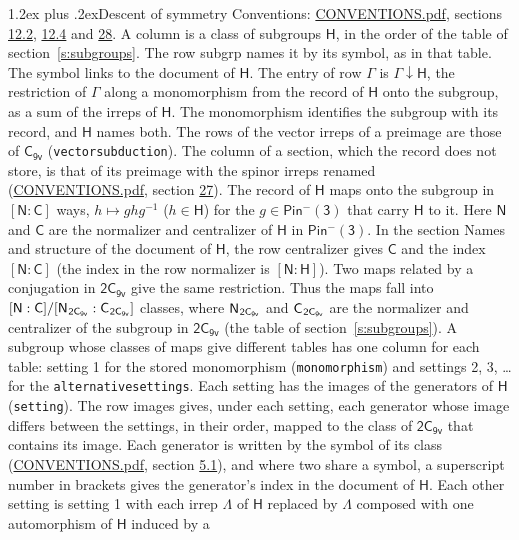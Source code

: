 \documentclass[10pt,a4paper]{article}
\makeatletter
\renewcommand\section{\@startsection{section}{1}{\z@}{-3ex plus -1ex minus -.2ex}%
  {1.2ex plus .2ex}{\normalfont\large\sffamily\bfseries\color{parttitle}}}
\numberwithin{equation}{section}
\newcommand{\grp}[1]{\mathsf{#1}}
\newcommand{\grpindex}[2]{[#1 : #2]}
\newcommand{\restr}[2]{#1\!\downarrow#2}
\newcommand{\hairsp}{\mkern1mu}
\makeatother
\begin{document}
\section{Descent of symmetry}\label{s:subduction}
Conventions: \href{../../CONVENTIONS.pdf}{CONVENTIONS.pdf}, sections \href{../../../rotation/CONVENTIONS.pdf\#conv.12.2}{12.2}, \href{../../../rotation/CONVENTIONS.pdf\#conv.12.4}{12.4} and \href{../../CONVENTIONS.pdf\#conv.28}{28}.
A column is a class of subgroups $\grp{H}$, in the order of the table of section~\ref{s:subgroups}. The row subgrp names it by its symbol, as in that table. The symbol links to the document of $\grp{H}$. The entry of row $\Gamma$ is $\restr{\Gamma}{\grp{H}}$, the restriction of $\Gamma$ along a monomorphism from the record of $\grp{H}$ onto the subgroup, as a sum of the irreps of $\grp{H}$. The monomorphism identifies the subgroup with its record, and $\grp{H}$ names both. The rows of the vector irreps of a preimage are those of \href{../../../rotation/data/pdf/C9v.pdf}{$\grp{C_{9v}}$} (\texttt{vectorsubduction}). The column of a section, which the record does not store, is that of its preimage with the spinor irreps renamed (\href{../../CONVENTIONS.pdf}{CONVENTIONS.pdf}, section \href{../../CONVENTIONS.pdf\#conv.27}{27}). \label{n:group.normalizer.o3}\label{n:group.centralizer.o3}\label{n:element.h}The record of $\grp{H}$ maps onto the subgroup in $\grpindex{\grp{N}}{\grp{C}}$ ways, $h \mapsto g h g^{-1}$ ($h \in \grp{H}$) for the $g \in \grp{Pin^{-}(3)}$ that carry $\grp{H}$ to it. Here $\grp{N}$ and $\grp{C}$ are the normalizer and centralizer of $\grp{H}$ in \href{Pinminus3.pdf}{$\grp{Pin^{-}(3)}$}. In the section Names and structure of the document of $\grp{H}$, the row centralizer gives $\grp{C}$ and the index $\grpindex{\grp{N}}{\grp{C}}$ (the index in the row normalizer is $\grpindex{\grp{N}}{\grp{H}}$). Two maps related by a conjugation in $\grp{2C_{9v}}$ give the same restriction. Thus the maps fall into $\grpindex{\grp{N}}{\grp{C}}/\grpindex{\grp{N}_{\hairsp \grp{2C_{9v}}}}{\grp{C}_{\hairsp \grp{2C_{9v}}}}$ classes, where $\grp{N}_{\hairsp \grp{2C_{9v}}}$ and $\grp{C}_{\hairsp \grp{2C_{9v}}}$ are the normalizer and centralizer of the subgroup in $\grp{2C_{9v}}$ (the table of section~\ref{s:subgroups}). \label{n:head.setting}A subgroup whose classes of maps give different tables has one column for each table: setting 1 for the stored monomorphism (\texttt{monomorphism}) and settings 2, 3, \dots{} for the \texttt{alternativesettings}. Each setting has the images of the generators of $\grp{H}$ (\texttt{setting}). \label{n:head.images}The row images gives, under each setting, each generator whose image differs between the settings, in their order, mapped to the class of $\grp{2C_{9v}}$ that contains its image. Each generator is written by the symbol of its class (\href{../../CONVENTIONS.pdf}{CONVENTIONS.pdf}, section \href{../../../rotation/CONVENTIONS.pdf\#conv.5.1}{5.1}), and where two share a symbol, a superscript number in brackets gives the generator's index in the document of $\grp{H}$. \label{n:irrep.Delta}Each other setting is setting 1 with each irrep $\Lambda$ of $\grp{H}$ replaced by $\Lambda$ composed with one automorphism of $\grp{H}$ induced by a 
\end{document}

